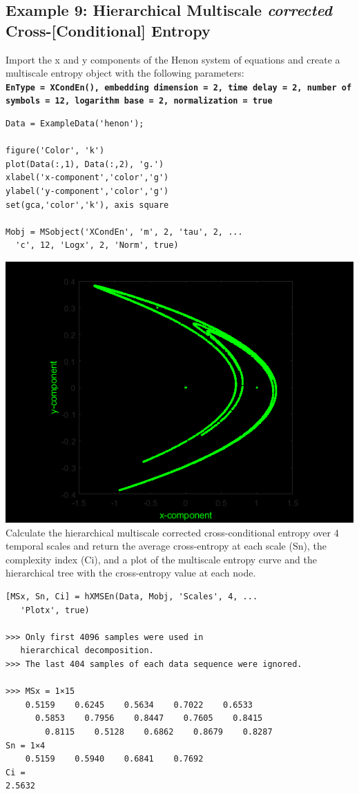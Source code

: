 \documentclass[12pt, a4paper, titlepage, openany]{book}
\begin{document}
\subsection{\normalsize Example 9: \hspace{15mm} Hierarchical Multiscale \emph{corrected} Cross-[Conditional] Entropy}
\noindent Import the x and y components of the Henon system of equations and create a multiscale entropy object with the following parameters:\\
\texttt{\textbf{EnType =  XCondEn(), embedding dimension = 2, time delay = 2, number of symbols = 12, logarithm base = 2, normalization = true}}
\begin{verbatim}
Data = ExampleData('henon');

figure('Color', 'k')
plot(Data(:,1), Data(:,2), 'g.')
xlabel('x-component','color','g')
ylabel('y-component','color','g')
set(gca,'color','k'), axis square

Mobj = MSobject('XCondEn', 'm', 2, 'tau', 2, ...
  'c', 12, 'Logx', 2, 'Norm', true)
\end{verbatim}
\includegraphics[scale=.65]{henon.png}\newline \newline
Calculate the hierarchical multiscale corrected cross-conditional entropy over 4 temporal scales and return the average cross-entropy at each scale (Sn), the complexity index (Ci), and a plot of the multiscale entropy curve and the hierarchical tree with the cross-entropy value at each node.
\begin{verbatim}
[MSx, Sn, Ci] = hXMSEn(Data, Mobj, 'Scales', 4, ...
   'Plotx', true)
   
>>> Only first 4096 samples were used in 
   hierarchical decomposition.
>>> The last 404 samples of each data sequence were ignored. 

>>> MSx = 1×15
    0.5159    0.6245    0.5634    0.7022    0.6533  
      0.5853    0.7956    0.8447    0.7605    0.8415  
        0.8115    0.5128    0.6862    0.8679    0.8287
Sn = 1×4
    0.5159    0.5940    0.6841    0.7692
Ci = 
2.5632
\end{verbatim}
\end{document}

